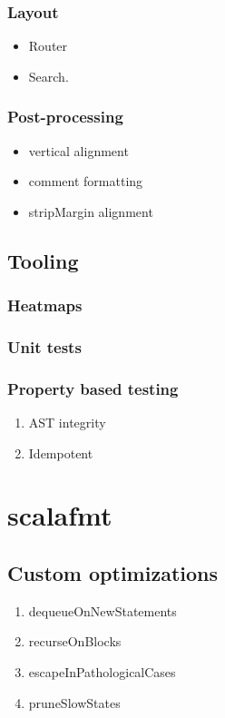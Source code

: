 \documentclass[11pt,a4paper]{article}
\begin{document}
\subsubsection{Layout}
\begin{itemize}
\item
 Router
\item
 Search.
\end{itemize}
\subsubsection{Post-processing}
\begin{itemize}
\item
 vertical alignment
\item
 comment formatting
\item
 stripMargin alignment
\end{itemize}
\subsection{Tooling} \subsubsection{Heatmaps} \subsubsection{Unit tests} \subsubsection{Property based testing}
\begin{enumerate}
\item
 AST integrity
\item
 Idempotent
\end{enumerate}
\section{scalafmt}
\subsection{Custom optimizations}
\begin{enumerate}
\item
 dequeueOnNewStatements
\item
 recurseOnBlocks
\item
 escapeInPathologicalCases
\item
 pruneSlowStates
\end{enumerate}
\end{document}
